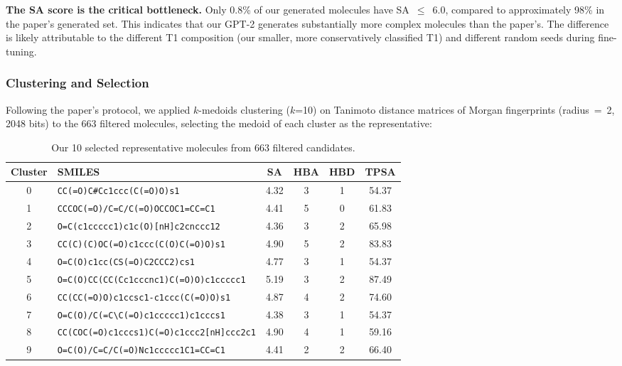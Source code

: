\documentclass[11pt,a4paper]{article}
\begin{document}
\textbf{The SA score is the critical bottleneck.} Only 0.8\% of our generated molecules have SA~$\leq$~6.0, compared to approximately 98\% in the paper's generated set. This indicates that our GPT-2 generates substantially more complex molecules than the paper's. The difference is likely attributable to the different T1 composition (our smaller, more conservatively classified T1) and different random seeds during fine-tuning.

\subsubsection{Clustering and Selection}

Following the paper's protocol, we applied $k$-medoids clustering ($k$=10) on Tanimoto distance matrices of Morgan fingerprints (radius~=~2, 2048 bits) to the 663 filtered molecules, selecting the medoid of each cluster as the representative:

\begin{table}[H]
\centering
\caption{Our 10 selected representative molecules from 663 filtered candidates.}
\label{tab:our_rep10}
\begin{tabular}{clcccc}
\toprule
Cluster & SMILES & SA & HBA & HBD & TPSA \\
\midrule
0 & \texttt{CC(=O)C\#Cc1ccc(C(=O)O)s1} & 4.32 & 3 & 1 & 54.37 \\
1 & \texttt{CCCOC(=O)/C=C/C(=O)OCCOC1=CC=C1} & 4.41 & 5 & 0 & 61.83 \\
2 & \texttt{O=C(c1ccccc1)c1c(O)[nH]c2cnccc12} & 4.36 & 3 & 2 & 65.98 \\
3 & \texttt{CC(C)(C)OC(=O)c1ccc(C(O)C(=O)O)s1} & 4.90 & 5 & 2 & 83.83 \\
4 & \texttt{O=C(O)c1cc(CS(=O)C2CCC2)cs1} & 4.77 & 3 & 1 & 54.37 \\
5 & \texttt{O=C(O)CC(CC(Cc1cccnc1)C(=O)O)c1ccccc1} & 5.19 & 3 & 2 & 87.49 \\
6 & \texttt{CC(CC(=O)O)c1ccsc1-c1ccc(C(=O)O)s1} & 4.87 & 4 & 2 & 74.60 \\
7 & \texttt{O=C(O)/C(=C\textbackslash C(=O)c1ccccc1)c1cccs1} & 4.38 & 3 & 1 & 54.37 \\
8 & \texttt{CC(COC(=O)c1cccs1)C(=O)c1ccc2[nH]ccc2c1} & 4.90 & 4 & 1 & 59.16 \\
9 & \texttt{O=C(O)/C=C/C(=O)Nc1ccccc1C1=CC=C1} & 4.41 & 2 & 2 & 66.40 \\
\bottomrule
\end{tabular}
\end{table}
\end{document}

